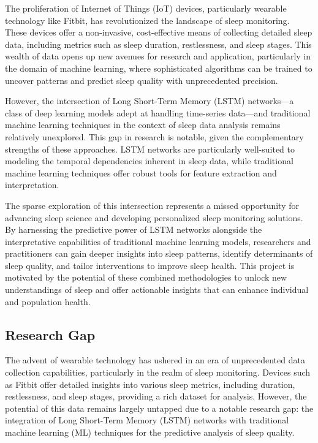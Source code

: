 \documentclass[10pt]{extarticle}
\begin{document}
The proliferation of Internet of Things (IoT) devices, particularly wearable technology like Fitbit, has revolutionized the landscape of sleep monitoring. These devices offer a non-invasive, cost-effective means of collecting detailed sleep data, including metrics such as sleep duration, restlessness, and sleep stages. This wealth of data opens up new avenues for research and application, particularly in the domain of machine learning, where sophisticated algorithms can be trained to uncover patterns and predict sleep quality with unprecedented precision.

However, the intersection of Long Short-Term Memory (LSTM) networks—a class of deep learning models adept at handling time-series data—and traditional machine learning techniques in the context of sleep data analysis remains relatively unexplored. This gap in research is notable, given the complementary strengths of these approaches. LSTM networks are particularly well-suited to modeling the temporal dependencies inherent in sleep data, while traditional machine learning techniques offer robust tools for feature extraction and interpretation.

The sparse exploration of this intersection represents a missed opportunity for advancing sleep science and developing personalized sleep monitoring solutions. By harnessing the predictive power of LSTM networks alongside the interpretative capabilities of traditional machine learning models, researchers and practitioners can gain deeper insights into sleep patterns, identify determinants of sleep quality, and tailor interventions to improve sleep health. This project is motivated by the potential of these combined methodologies to unlock new understandings of sleep and offer actionable insights that can enhance individual and population health.

\subsection{Research Gap}

The advent of wearable technology has ushered in an era of unprecedented data collection capabilities, particularly in the realm of sleep monitoring. Devices such as Fitbit offer detailed insights into various sleep metrics, including duration, restlessness, and sleep stages, providing a rich dataset for analysis. However, the potential of this data remains largely untapped due to a notable research gap: the integration of Long Short-Term Memory (LSTM) networks with traditional machine learning (ML) techniques for the predictive analysis of sleep quality.
\end{document}
